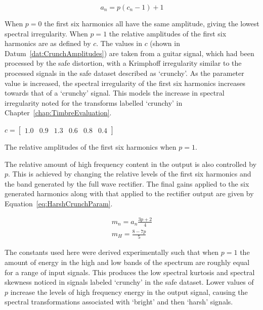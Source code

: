 			\begin{equation}
				a_{n} = p(c_{n} - 1) + 1
				\label{eq:HarshCrunchAmps}
			\end{equation}

			When $p = 0$ the first six harmonics all have the same amplitude, giving the lowest spectral
			irregularity. When $p = 1$ the relative amplitudes of the first six harmonics are as defined by
			$c$.  The values in $c$ (shown in Datum~\ref{dat:CrunchAmplitudes}) are taken from a guitar signal,
			which had been processed by the \acrshort{safe} distortion, with a Krimphoff irregularity similar
			to the processed signals in the \acrshort{safe} dataset described as `crunchy'. As the parameter
			value is increased, the spectral irregularity of the first six harmonics increases towards that of
			a `crunchy' signal.  This models the increase in spectral irregularity noted for the transforms
			labelled `crunchy' in Chapter~\ref{chap:TimbreEvaluation}.

			\begin{datum}[h!]
				\centering
				$c = \begin{bmatrix}
					1.0 & 0.9 & 1.3 & 0.6 & 0.8 & 0.4
				     \end{bmatrix}$
				\caption{The relative amplitudes of the first six harmonics when $p = 1$.}
				\label{dat:CrunchAmplitudes}
			\end{datum}
			
			The relative amount of high frequency content in the output is also controlled by $p$. This is
			achieved by changing the relative levels of the first six harmonics and the band generated by the
			full wave rectifier. The final gains applied to the six generated harmonics along with that applied
			to the rectifier output are given by Equation~\ref{eq:HarshCrunchParam}.

			\begin{gather}
				m_{n} = a_{n}\frac{3p + 2}{4} \nonumber \\
				m_{H} = \frac{8 - 7p}{5}
				\label{eq:HarshCrunchParam}
			\end{gather}

			The constants used here were derived experimentally such that when $p = 1$ the amount of energy in
			the high and low bands of the spectrum are roughly equal for a range of input signals. This
			produces the low spectral kurtosis and spectral skewness noticed in signals labeled `crunchy' in
			the \acrshort{safe} dataset. Lower values of $p$ increase the levels of high frequency energy in
			the output signal, causing the spectral transformations associated with `bright' and then `harsh'
			signals.

